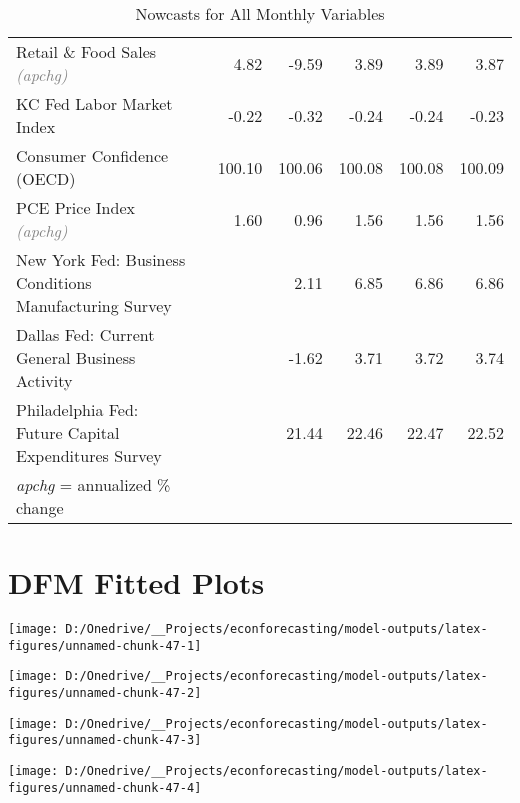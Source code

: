 \documentclass[11pt, letterpaper]{article}\usepackage[]{graphicx}\usepackage[]{color}
\begin{document}
\begin{table}[H]
\begin{tabular}{lrrrrrr}
  Retail \& Food Sales \textit{\footnotesize\textcolor{gray}{(apchg)}} &  & 4.82 & -9.59 & 3.89 & 3.89 & 3.87 \\ 
  KC Fed Labor Market Index &  & -0.22 & -0.32 & -0.24 & -0.24 & -0.23 \\ 
  Consumer Confidence (OECD) &  & 100.10 & 100.06 & 100.08 & 100.08 & 100.09 \\ 
  PCE Price Index \textit{\footnotesize\textcolor{gray}{(apchg)}} &  & 1.60 & 0.96 & 1.56 & 1.56 & 1.56 \\ 
  New York Fed: Business Conditions Manufacturing Survey &  &  & 2.11 & 6.85 & 6.86 & 6.86 \\ 
  Dallas Fed: Current General Business Activity &  &  & -1.62 & 3.71 & 3.72 & 3.74 \\ 
  Philadelphia Fed: Future Capital Expenditures Survey &  &  & 21.44 & 22.46 & 22.47 & 22.52 \\ 
   \hline 
 \textit{apchg} = annualized \% change 
\end{tabular}
\endgroup
\caption{Nowcasts for All Monthly Variables} 
\end{table}



\appendix
\appendixpage
\addappheadtotoc

\section{DFM Fitted Plots}


{\centering \texttt{[image: D:/Onedrive/\_\_Projects/econforecasting/model-outputs/latex-figures/unnamed-chunk-47-1]} 

}




{\centering \texttt{[image: D:/Onedrive/\_\_Projects/econforecasting/model-outputs/latex-figures/unnamed-chunk-47-2]} 

}




{\centering \texttt{[image: D:/Onedrive/\_\_Projects/econforecasting/model-outputs/latex-figures/unnamed-chunk-47-3]} 

}




{\centering \texttt{[image: D:/Onedrive/\_\_Projects/econforecasting/model-outputs/latex-figures/unnamed-chunk-47-4]} 

}
\end{document}
